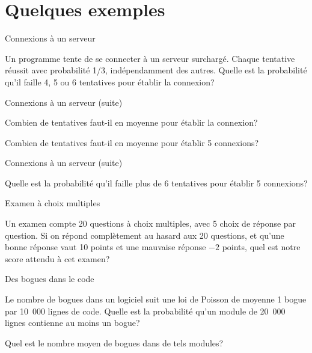 \documentclass{BeamerTemplate}
\newcommand{\cibleReponse}{}
\newcommand{\lienreponse}[1]{\gdef\cibleReponse{#1}}
\begin{document}
\section{Quelques exemples}

\begin{frame}[t,label=exconn]{Connexions à un serveur}

{\small
Un programme tente de se connecter à un serveur surchargé. Chaque tentative réussit avec probabilité 1/3, indépendamment des autres.
Quelle est la probabilité qu'il faille 4, 5 ou 6 tentatives pour établir la connexion?
}

\lienreponse{rep-ex}
\end{frame}


\begin{frame}[t]{Connexions à un serveur (suite)}

{\small
Combien de tentatives faut-il en moyenne pour établir la connexion?
}

\vspace{1in}
{\small
Combien de tentatives faut-il en moyenne pour établir 5 connexions?
}
\lienreponse{rep-ex}
\end{frame}


\begin{frame}[t]{Connexions à un serveur (suite)}

{\small
Quelle est la probabilité qu'il faille plus de 6 tentatives pour établir 5 connexions?
}

\lienreponse{rep-ex}
\end{frame}


\begin{frame}[t,label=exexamen]{Examen à choix multiples}

{\small Un examen compte 20 questions à choix multiples, avec 5 choix
de réponse par question. Si on répond complètement au hasard aux 20 questions,
et qu'une bonne réponse vaut 10 points et une mauvaise réponse $-2$ points,
quel est notre score attendu à cet examen?
}
\lienreponse{rep-ex}
\end{frame}

\begin{frame}[t,label=exbogues]{Des bogues dans le code}

{\small
Le nombre de bogues dans un logiciel suit une loi de Poisson de moyenne
1 bogue par 10~000 lignes de code. Quelle est la probabilité qu'un module
de 20~000 lignes contienne au moins un bogue?

\vspace{1.5in}
Quel est le nombre moyen de bogues dans de tels modules?
}
\lienreponse{rep-ex}
\end{frame}
\end{document}
